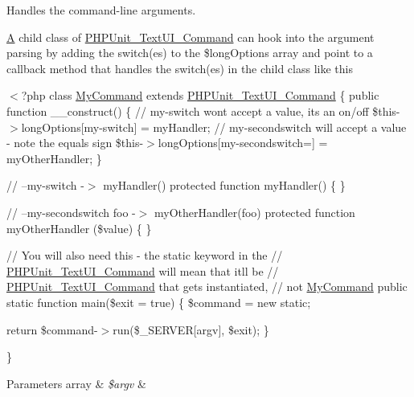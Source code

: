 Handles the command-\/line arguments.

\mbox{\hyperlink{class_a}{A}} child class of \mbox{\hyperlink{class_p_h_p_unit___text_u_i___command}{P\+H\+P\+Unit\+\_\+\+Text\+U\+I\+\_\+\+Command}} can hook into the argument parsing by adding the switch(es) to the \$long\+Options array and point to a callback method that handles the switch(es) in the child class like this

{\ttfamily  $<$?php class \mbox{\hyperlink{class_my_command}{My\+Command}} extends \mbox{\hyperlink{class_p_h_p_unit___text_u_i___command}{P\+H\+P\+Unit\+\_\+\+Text\+U\+I\+\_\+\+Command}} \{ public function \+\_\+\+\_\+construct() \{ // my-\/switch won\textquotesingle{}t accept a value, it\textquotesingle{}s an on/off \$this-\/$>$long\+Options\mbox{[}\textquotesingle{}my-\/switch\textquotesingle{}\mbox{]} = \textquotesingle{}my\+Handler\textquotesingle{}; // my-\/secondswitch will accept a value -\/ note the equals sign \$this-\/$>$long\+Options\mbox{[}\textquotesingle{}my-\/secondswitch=\textquotesingle{}\mbox{]} = \textquotesingle{}my\+Other\+Handler\textquotesingle{}; \}}

{\ttfamily  // --my-\/switch -\/$>$ my\+Handler() protected function my\+Handler() \{ \}}

{\ttfamily  // --my-\/secondswitch foo -\/$>$ my\+Other\+Handler(\textquotesingle{}foo\textquotesingle{}) protected function my\+Other\+Handler (\$value) \{ \}}

{\ttfamily  // You will also need this -\/ the static keyword in the // \mbox{\hyperlink{class_p_h_p_unit___text_u_i___command}{P\+H\+P\+Unit\+\_\+\+Text\+U\+I\+\_\+\+Command}} will mean that it\textquotesingle{}ll be // \mbox{\hyperlink{class_p_h_p_unit___text_u_i___command}{P\+H\+P\+Unit\+\_\+\+Text\+U\+I\+\_\+\+Command}} that gets instantiated, // not \mbox{\hyperlink{class_my_command}{My\+Command}} public static function main(\$exit = true) \{ \$command = new static;}

{\ttfamily  return \$command-\/$>$run(\$\+\_\+\+S\+E\+R\+V\+ER\mbox{[}\textquotesingle{}argv\textquotesingle{}\mbox{]}, \$exit); \}}

{\ttfamily \} }


\begin{DoxyParams}[1]{Parameters}
array & {\em \$argv} & \\
\hline
\end{DoxyParams}
\mbox{\label{class_p_h_p_unit___text_u_i___command_a5180182e50fae4b44de58f4c0f68e81d}} 
